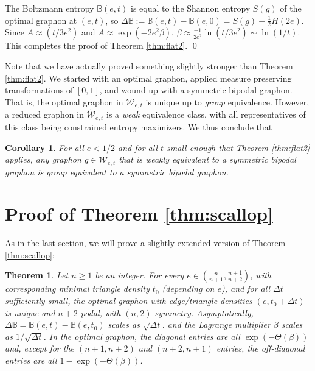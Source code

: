 \documentclass[12pt]{amsart}
\newtheorem{corollary}[lemma]{Corollary}
\newtheorem{theorem}[lemma]{Theorem}
\newcommand{\B}{\mathbb{B}}
\newcommand{\regular}{\mathcal{W}}
\newcommand{\reduced}{\widetilde {\mathcal{W}}}
\begin{document}
{The Boltzmann entropy $\B(e,t)$ is equal to the 
Shannon entropy $S(g)$ of the optimal graphon at $(e,t)$, so 
$\Delta \B := \B(e,t) - \B(e,0) = S(g)- \frac12 H(2e)$. 
Since $A \approx(t/3e^2)$ and $A \approx \exp(-2e^2\beta)$, 
$\beta \approx \frac{-1}{2e^2} \ln(t/3e^2) \sim \ln(1/t)$. This completes the proof of Theorem \ref{thm:flat2}.
\qed

Note that we have actually proved something slightly stronger than
Theorem \ref{thm:flat2}. We started with an optimal graphon, applied measure 
preserving transformations of $[0,1]$, and wound up with a symmetric bipodal 
graphon. That is, the optimal graphon in $\regular_{e,t}$ is unique up to {\em group}
equivalence. However, a reduced graphon in $\reduced_{e,t}$ is a {\em weak}
equivalence class, with all representatives of this class being constrained 
entropy maximizers. We thus conclude that 

\begin{corollary}\label{cor:flat2} For all $e<1/2$ and for all $t$ small enough that Theorem \ref{thm:flat2}
applies, any graphon $g \in \regular_{e,t}$ that is weakly equivalent 
to a symmetric bipodal graphon is group equivalent to a symmetric bipodal graphon. 
\end{corollary}

\section{Proof of Theorem \ref{thm:scallop}}

As in the last section, we will prove a slightly extended version 
of Theorem \ref{thm:scallop}: 

\begin{theorem} \label{thm:scallop2}
Let $n \ge 1$ be an integer. For every $e \in \left ( \frac{n}{n+1}, \frac{n+1}{n+2}\right )$, with 
corresponding minimal triangle density $t_0$ (depending on $e$), 
and for all
$\Delta t$ sufficiently small, the optimal graphon with edge/triangle densities $(e, t_0 + \Delta t)$
is unique and $n+2$-podal, with $(n,2)$ symmetry. Asymptotically, 
$\Delta \B = \B(e,t) - 
\B(e,t_0)$ scales as $\sqrt{\Delta t}$.
and the Lagrange multiplier 
$\beta$ scales as $1/\sqrt{\Delta t}$.
In the optimal graphon, the diagonal entries are all $\exp(-\Theta(\beta))$ and, except for the 
$(n+1, n+2)$ and $(n+2,n+1)$ entries, the off-diagonal entries are all $1 - \exp(-\Theta(\beta))$.
\end{theorem}

}
\end{document}
